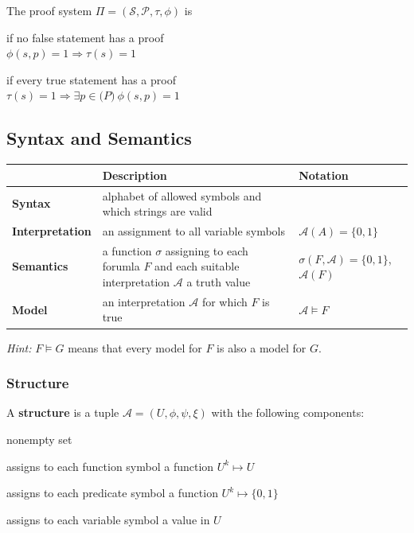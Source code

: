 \documentclass[11pt]{article}
\begin{document}
The proof system $\Pi = (\mathcal{S}, \mathcal{P}, \tau, \phi)$ is
\begin{description}[labelindent=16pt,style=multiline,leftmargin=3cm, noitemsep]
	\item[sound] if no false statement has a proof \\
				 $\phi(s, p) = 1 \Rightarrow \tau(s) = 1$ 
	\item[complete] if every true statement has a proof \\
				 $\tau(s) = 1 \Rightarrow \exists p \in \mathcal(P)\ \phi(s, p)=1$
\end{description}

\subsection{Syntax and Semantics}

\begin{table}[H]
\centering
\begin{tabular}{|p{3cm}|p{6cm}|p{4cm}|}
\hline
                   			& \textbf{Description} 						   				& \textbf{Notation}	\\ \hline
\textbf{Syntax} 			& alphabet of allowed symbols and which strings are valid	&  \\ \hline
\textbf{Interpretation}  	& an assignment to all variable symbols						& $\mathcal{A}(A) = \{0, 1\}$ \\ \hline
\textbf{Semantics}		  	& a function $\sigma$ assigning to each forumla $F$ and each suitable interpretation $\mathcal{A}$ a truth value& $\sigma(F, \mathcal{A}) = \{0, 1\}$, \filbreak $\mathcal{A}(F)$ \\ \hline
\textbf{Model}			  	& an interpretation $\mathcal{A}$ for which $F$ is true 	& $\mathcal{A} \models F$ \\ \hline

\end{tabular}
\end{table}

\emph{Hint:} $F \models G$ means that every model for $F$ is also a model for $G$.

\subsubsection{Structure}

A \textbf{structure} is a tuple $\mathcal{A} = (U, \phi, \psi, \xi)$ with the following components:
\begin{description}[labelindent=16pt,style=multiline,leftmargin=3cm, noitemsep]
	\item[universe $U$:] nonempty set
	\item[function $\phi$:] assigns to each function symbol a function $U^k \mapsto U$
	\item[function $\psi$:] assigns to each predicate symbol a function $U^k \mapsto \{0,1\}$
	\item[function $\xi$:] assigns to each variable symbol a value in $U$
\end{description}
\end{document}

